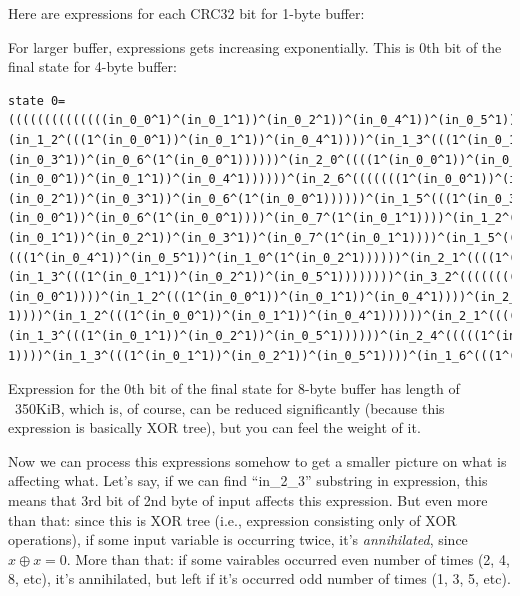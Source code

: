 Here are expressions for each CRC32 bit for 1-byte buffer:



For larger buffer, expressions gets increasing exponentially.
This is 0th bit of the final state for 4-byte buffer:

\begin{lstlisting}
state 0=((((((((((((((in_0_0^1)^(in_0_1^1))^(in_0_2^1))^(in_0_4^1))^(in_0_5^1))^(in_0_7^(1^(in_0_1^1))))^(in_1_0^(1^(in_0_2^1))))^
(in_1_2^(((1^(in_0_0^1))^(in_0_1^1))^(in_0_4^1))))^(in_1_3^(((1^(in_0_1^1))^(in_0_2^1))^(in_0_5^1))))^(in_1_4^(((1^(in_0_2^1))^
(in_0_3^1))^(in_0_6^(1^(in_0_0^1))))))^(in_2_0^((((1^(in_0_0^1))^(in_0_6^(1^(in_0_0^1))))^(in_0_7^(1^(in_0_1^1))))^(in_1_2^(((1^
(in_0_0^1))^(in_0_1^1))^(in_0_4^1))))))^(in_2_6^(((((((1^(in_0_0^1))^(in_0_1^1))^(in_0_2^1))^(in_0_6^(1^(in_0_0^1))))^(in_1_4^(((1^
(in_0_2^1))^(in_0_3^1))^(in_0_6^(1^(in_0_0^1))))))^(in_1_5^(((1^(in_0_3^1))^(in_0_4^1))^(in_0_7^(1^(in_0_1^1))))))^(in_2_0^((((1^
(in_0_0^1))^(in_0_6^(1^(in_0_0^1))))^(in_0_7^(1^(in_0_1^1))))^(in_1_2^(((1^(in_0_0^1))^(in_0_1^1))^(in_0_4^1))))))))^(in_2_7^(((((((1^
(in_0_1^1))^(in_0_2^1))^(in_0_3^1))^(in_0_7^(1^(in_0_1^1))))^(in_1_5^(((1^(in_0_3^1))^(in_0_4^1))^(in_0_7^(1^(in_0_1^1))))))^(in_1_6^
(((1^(in_0_4^1))^(in_0_5^1))^(in_1_0^(1^(in_0_2^1))))))^(in_2_1^((((1^(in_0_1^1))^(in_0_7^(1^(in_0_1^1))))^(in_1_0^(1^(in_0_2^1))))^
(in_1_3^(((1^(in_0_1^1))^(in_0_2^1))^(in_0_5^1))))))))^(in_3_2^(((((((((1^(in_0_1^1))^(in_0_2^1))^(in_0_4^1))^(in_0_5^1))^(in_0_6^(1^
(in_0_0^1))))^(in_1_2^(((1^(in_0_0^1))^(in_0_1^1))^(in_0_4^1))))^(in_2_0^((((1^(in_0_0^1))^(in_0_6^(1^(in_0_0^1))))^(in_0_7^(1^(in_0_1^
1))))^(in_1_2^(((1^(in_0_0^1))^(in_0_1^1))^(in_0_4^1))))))^(in_2_1^((((1^(in_0_1^1))^(in_0_7^(1^(in_0_1^1))))^(in_1_0^(1^(in_0_2^1))))^
(in_1_3^(((1^(in_0_1^1))^(in_0_2^1))^(in_0_5^1))))))^(in_2_4^(((((1^(in_0_0^1))^(in_0_4^1))^(in_1_2^(((1^(in_0_0^1))^(in_0_1^1))^(in_0_4^
1))))^(in_1_3^(((1^(in_0_1^1))^(in_0_2^1))^(in_0_5^1))))^(in_1_6^(((1^(in_0_4^1))^(in_0_5^1))^(in_1_0^(1^(in_0_2^1))))))))))
\end{lstlisting}

Expression for the 0th bit of the final state for 8-byte buffer has length of ~350KiB, which is, of course, can be reduced
significantly (because this expression is basically XOR tree), but you can feel the weight of it.

Now we can process this expressions somehow to get a smaller picture on what is affecting what.
Let's say, if we can find ``in\_2\_3'' substring in expression, this means that 3rd bit of 2nd byte of input
affects this expression.
But even more than that: since this is XOR tree (i.e., expression consisting only of XOR operations),
if some input variable is occurring twice, it's \textit{annihilated}, since $x \oplus x=0$.
More than that: if some vairables occurred even number of times (2, 4, 8, etc), it's annihilated, but left if it's occurred
odd number of times (1, 3, 5, etc).

